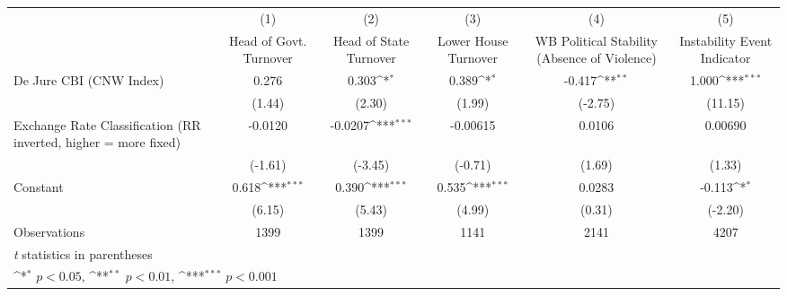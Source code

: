 {
\def\sym#1{\ifmmode^{#1}\else\(^{#1}\)\fi}
\begin{tabular}{l*{5}{c}}
\hline\hline
                &\multicolumn{1}{c}{(1)}&\multicolumn{1}{c}{(2)}&\multicolumn{1}{c}{(3)}&\multicolumn{1}{c}{(4)}&\multicolumn{1}{c}{(5)}\\
                &\multicolumn{1}{c}{Head of Govt. Turnover}&\multicolumn{1}{c}{Head of State Turnover}&\multicolumn{1}{c}{Lower House Turnover}&\multicolumn{1}{c}{WB Political Stability (Absence of Violence)}&\multicolumn{1}{c}{Instability Event Indicator}\\
\hline
De Jure CBI (CNW Index)&    0.276         &    0.303\sym{*}  &    0.389\sym{*}  &   -0.417\sym{**} &    1.000\sym{***}\\
                &   (1.44)         &   (2.30)         &   (1.99)         &  (-2.75)         &  (11.15)         \\
[1em]
Exchange Rate Classification (RR inverted, higher = more fixed)&  -0.0120         &  -0.0207\sym{***}& -0.00615         &   0.0106         &  0.00690         \\
                &  (-1.61)         &  (-3.45)         &  (-0.71)         &   (1.69)         &   (1.33)         \\
[1em]
Constant        &    0.618\sym{***}&    0.390\sym{***}&    0.535\sym{***}&   0.0283         &   -0.113\sym{*}  \\
                &   (6.15)         &   (5.43)         &   (4.99)         &   (0.31)         &  (-2.20)         \\
\hline
Observations    &     1399         &     1399         &     1141         &     2141         &     4207         \\
\hline\hline
\multicolumn{6}{l}{\footnotesize \textit{t} statistics in parentheses}\\
\multicolumn{6}{l}{\footnotesize \sym{*} \(p<0.05\), \sym{**} \(p<0.01\), \sym{***} \(p<0.001\)}\\
\end{tabular}
}
